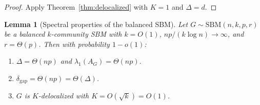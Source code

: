 \documentclass[11pt]{article}
\newtheorem{lemma}[theorem]{Lemma}
\theoremstyle{definition}
\newcommand{\lamG}{\lambda_1(A_G)}
\begin{document}
\begin{proof}
Apply Theorem~\ref{thm:delocalized} with $K = 1$ and $\Delta = d$.
\end{proof}

\begin{lemma}[Spectral properties of the balanced SBM]\label{lem:sbm-spectral}
Let $G \sim \mathrm{SBM}(n, k, p, r)$ be a balanced $k$-community SBM with
$k = O(1)$, $np/(k\log n) \to \infty$, and $r = \Theta(p)$.
Then with probability $1 - o(1)$:
\begin{enumerate}[label=(\roman*),nosep]
\item $\Delta = \Theta(np)$ and $\lamG = \Theta(np)$.
\item $\delta_{\mathrm{gap}} = \Theta(np) = \Theta(\Delta)$.
\item $G$ is $K$-delocalized with $K = O(\sqrt{k}) = O(1)$.
\end{enumerate}
\end{lemma}
\end{document}
